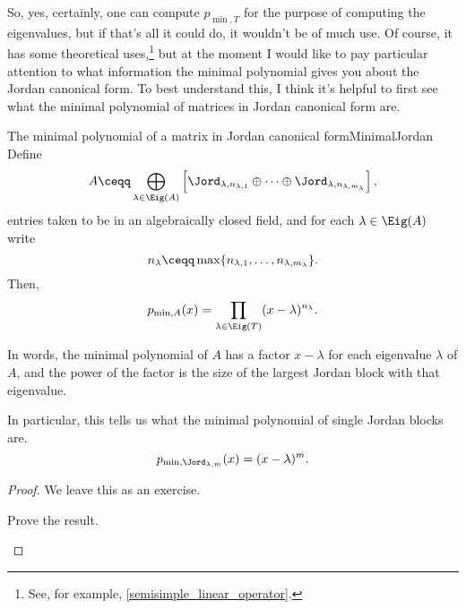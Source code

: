 So, yes, certainly, one can compute $p_{\min ,T}$ for the purpose of computing the eigenvalues, but if that's all it could do, it wouldn't be of much use.  Of course, it has some theoretical uses,\footnote{See, for example, \cref{semisimple_linear_operator}.} but at the moment I would like to pay particular attention to what information the minimal polynomial gives you about the Jordan canonical form.  To best understand this, I think it's helpful to first see what the minimal polynomial of matrices in Jordan canonical form are.
\begin{prp}{The minimal polynomial of a matrix in Jordan canonical form}{MinimalJordan}
	Define
	\begin{equation}
		A\ceqq \bigoplus _{\lambda \in \Eig (A)}\left[ \Jord _{\lambda ,n_{\lambda ,1}}\oplus \cdots \oplus \Jord _{\lambda ,n_{\lambda ,m_{\lambda}}}\right] ,
	\end{equation}
	entries taken to be in an algebraically closed field, and for each $\lambda \in \Eig (A)$ write
	\begin{equation}
		n_{\lambda}\ceqq \max \{ n_{\lambda ,1},\ldots ,n_{\lambda ,m_{\lambda}}\} .
	\end{equation}
	Then,
	\begin{equation}
		p_{\min ,A}(x)=\prod _{\lambda \in \Eig (T)}(x-\lambda )^{n_{\lambda}}.
	\end{equation}
	\begin{rmk}
		In words, the minimal polynomial of $A$ has a factor $x-\lambda$ for each eigenvalue $\lambda$ of $A$, and the power of the factor is the size of the largest Jordan block with that eigenvalue.
	\end{rmk}
	\begin{rmk}
		In particular, this tells us what the minimal polynomial of single Jordan blocks are.
		\begin{equation}
			p_{\min ,\Jord _{\lambda ,m}}(x)=(x-\lambda )^m.
		\end{equation}
	\end{rmk}
	\begin{proof}
		We leave this as an exercise.
		\begin{exr}[breakable=false]{}{}
			Prove the result.
		\end{exr}
	\end{proof}
\end{prp}
